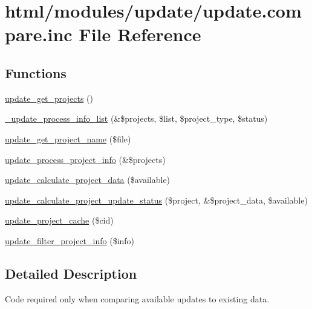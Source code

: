 \hypertarget{update_8compare_8inc}{
\section{html/modules/update/update.compare.inc File Reference}
\label{update_8compare_8inc}
}
\subsection*{Functions}
\begin{DoxyCompactItemize}
\item 
\hyperlink{update_8compare_8inc_a7e1ea49d91f2d2b81b8101d481d10300}{update\_\-get\_\-projects} ()
\item 
\hyperlink{update_8compare_8inc_a37eb8774bbb961b5d1113c116aba2f3b}{\_\-update\_\-process\_\-info\_\-list} (\&\$projects, \$list, \$project\_\-type, \$status)
\item 
\hyperlink{update_8compare_8inc_a02c561b213ab3df2e929917736dc2b7b}{update\_\-get\_\-project\_\-name} (\$file)
\item 
\hyperlink{update_8compare_8inc_ad14173209d3e9cf76fbd6d6d1977de05}{update\_\-process\_\-project\_\-info} (\&\$projects)
\item 
\hyperlink{update_8compare_8inc_aa0663304dc4634e4109c896f214ea791}{update\_\-calculate\_\-project\_\-data} (\$available)
\item 
\hyperlink{update_8compare_8inc_a964a0180687773bb39b53482d7106545}{update\_\-calculate\_\-project\_\-update\_\-status} (\$project, \&\$project\_\-data, \$available)
\item 
\hyperlink{update_8compare_8inc_a958705ecce49b020722280decff3f644}{update\_\-project\_\-cache} (\$cid)
\item 
\hyperlink{update_8compare_8inc_a8d1c29cf668adf2ea2a1a34f0f716cd1}{update\_\-filter\_\-project\_\-info} (\$info)
\end{DoxyCompactItemize}


\subsection{Detailed Description}
Code required only when comparing available updates to existing data. 

